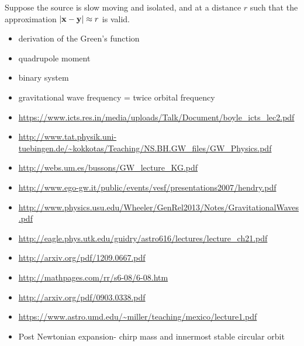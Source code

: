 Suppose the source is slow moving and isolated, and at a distance $r$ such that the approximation $|{\mathbf{x}} - {\mathbf{y}} | \approx r$ is valid. 

\begin{itemize}
\item derivation of the Green's function
\item quadrupole moment
\item binary system
\item gravitational wave frequency = twice orbital frequency
\item \url{https://www.icts.res.in/media/uploads/Talk/Document/boyle_icts_lec2.pdf} 
\item \url{http://www.tat.physik.uni-tuebingen.de/~kokkotas/Teaching/NS.BH.GW_files/GW_Physics.pdf}
\item \url{http://webs.um.es/bussons/GW_lecture_KG.pdf}
\item \url{http://www.ego-gw.it/public/events/vesf/presentations2007/hendry.pdf}
\item \url{http://www.physics.usu.edu/Wheeler/GenRel2013/Notes/GravitationalWaves.pdf}
\item \url{http://eagle.phys.utk.edu/guidry/astro616/lectures/lecture_ch21.pdf}
\item \url{http://arxiv.org/pdf/1209.0667.pdf}
\item \url{http://mathpages.com/rr/s6-08/6-08.htm}
\item \url{http://arxiv.org/pdf/0903.0338.pdf}
\item \url{https://www.astro.umd.edu/~miller/teaching/mexico/lecture1.pdf}
\item Post Newtonian expansion- chirp mass and innermost stable circular orbit
\end{itemize}
%

